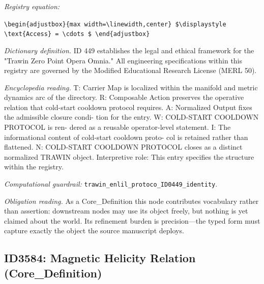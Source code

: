 \documentclass[11pt]{article}
\theoremstyle{remark}
\begin{document}
\noindent\textit{Registry equation:}\par
{\small\texttt{\textbackslash{}begin\{adjustbox\}\{max width=\textbackslash{}linewidth,center\} \$\textbackslash{}displaystyle \textbackslash{}text\{Access\} = \textbackslash{}cdots \$ \textbackslash{}end\{adjustbox\}}}\par\medskip
\noindent\textit{Dictionary definition.} ID 449 establishes the legal and ethical framework for the "Trawin Zero Point Opera Omnia." All engineering specifications within this registry are governed by the Modified Educational Research License (MERL 50).\par\medskip
\noindent\textit{Encyclopedia reading.} T: Carrier Map is localized within the manifold and metric dynamics arc of the directory. R: Composable Action preserves the operative relation that cold-start cooldown protocol requires. A: Normalized Output fixes the admissible closure condi- tion for the entry. W: COLD-START COOLDOWN PROTOCOL is ren- dered as a reusable operator-level statement. I: The informational content of cold-start cooldown proto- col is retained rather than flattened. N: COLD-START COOLDOWN PROTOCOL closes as a distinct normalized TRAWIN object. Interpretive role: This entry specifies the structure within the registry.
\par\medskip\noindent\textit{Computational guardrail:} \texttt{trawin\_enlil\_protoco\_ID0449\_identity}.
\par\medskip\noindent\textit{Obligation reading.} As a Core\_Definition this node contributes vocabulary rather than assertion: downstream nodes may use its object freely, but nothing is yet claimed about the world. Its refinement burden is precision---the typed form must capture exactly the object the source manuscript deploys.

\subsection{ID3584: Magnetic Helicity Relation (Core\_Definition)}
\end{document}

